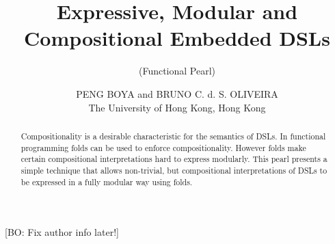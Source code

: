\documentclass{jfp1}
\newcommand\bruno[1]{\textcolor{green!70!black}{[BO: #1]}}
\begin{document}
\setlength{\pdfpageheight}{\paperheight}
\setlength{\pdfpagewidth}{\paperwidth}






\title{Expressive, Modular and Compositional Embedded DSLs}
\subtitle{(Functional Pearl)}

\author[P. Boya and B. C. d. S. Oliveira]
        {PENG BOYA and BRUNO C. d. S. OLIVEIRA\\
         The University of Hong Kong, Hong Kong\\
         }\bruno{Fix author info later!}


\maketitle

\begin{abstract}
Compositionality is a desirable characteristic for the semantics of
DSLs. In functional programming folds can be used to enforce
compositionality. However folds make certain compositional
interpretations hard to express modularly. This pearl presents a
simple technique that allows non-trivial, but compositional
interpretations of DSLs to be expressed in a fully modular way
using folds.


\begin{comment}

This paper presents composable algebra with dependencies: a new approach to compose 
algebras together to allow dependent interpretations with {\em fold}. 
For a given datatype represented by two-level-types\cite{sheard04}, if one of its 
interpretations depends on a second one, we compose the algebra correponding 
to the first interpretation with the one corresponding to the second, and use the 
composed algebra with {\em fold} to evaluate the expression. We present our approach 
on top of the domain specific language for parallel prefix circuits.

\end{comment}

\end{abstract}
\end{document}
